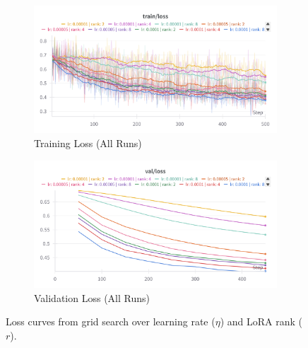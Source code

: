 \documentclass{article}
\begin{document}
\begin{figure}[!htbp]
    \centering
    \begin{subfigure}[b]{0.48\linewidth} \centering
        \includegraphics[width=\linewidth]{M2 Course Work//Images/grid_search_training_loss.png}
        \caption{Training Loss (All Runs)} \label{fig:grid_search_lr_rank_train_loss}
    \end{subfigure} \hfill
    \begin{subfigure}[b]{0.48\linewidth} \centering
        \includegraphics[width=\linewidth]{M2 Course Work//Images/grid_search_validiation_loss.png}
        \caption{Validation Loss (All Runs)} \label{fig:grid_search_lr_rank_valid_loss}
    \end{subfigure}
    \caption{Loss curves from grid search over learning rate ($\eta$) and LoRA rank ($r$).} %
    \label{fig:grid_search_lr_rank_loss_curves}
\end{figure}
\end{document}
